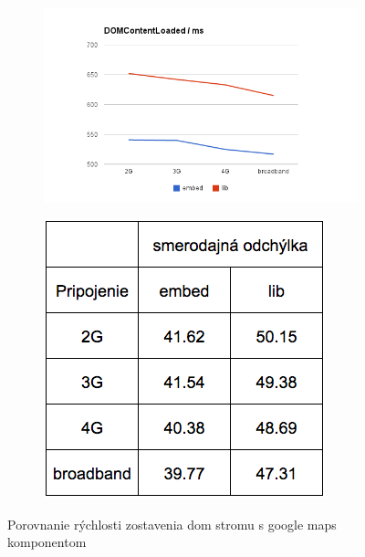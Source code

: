 \begin{figure}[H]
  \centering
  \begin{subfigure}[b]{0.6\textwidth}
          \includegraphics[width=\textwidth]{img/load/gmaps-dom.png}
  \end{subfigure}%
  \begin{subfigure}[b]{0.32\textwidth}
          \includegraphics[width=\textwidth]{img/load/gm-std-dom.png}
  \end{subfigure}%
  \caption[Porovnanie rýchlosti zostavenia dom stromu s google maps komponentom]{
    Porovnanie rýchlosti zostavenia dom stromu s google maps komponentom}
  \label{fig: gmaps-dom}
\end{figure}

